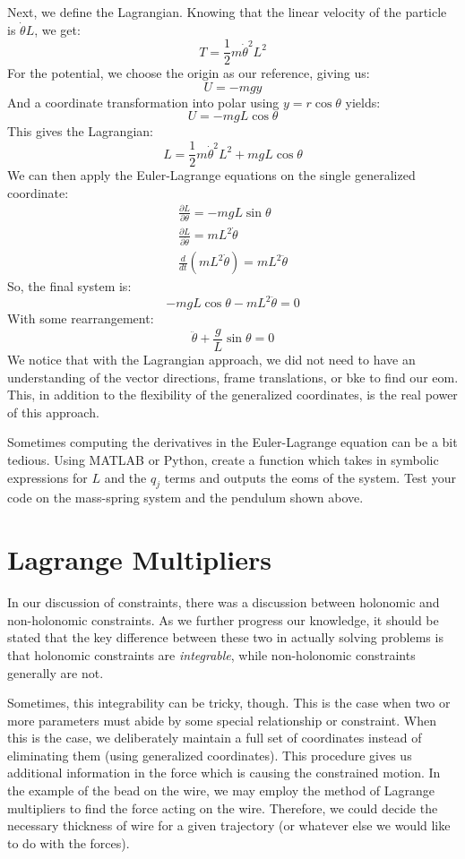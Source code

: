 Next, we define the \gls{Lagrangian}. Knowing that the linear velocity of the particle is $\dot{\theta}L$, we get:
$$T=\frac{1}{2}m\dot{\theta}^2L^2$$
For the potential, we choose the origin as our reference, giving us:
$$U=-mgy$$
And a coordinate transformation into polar using $y=r\cos\theta$ yields:
$$U=-mgL\cos\theta$$
This gives the \gls{Lagrangian}:
$$L=\frac{1}{2}m\dot{\theta}^2L^2+mgL\cos\theta$$
We can then apply the Euler-Lagrange equations on the single generalized coordinate:
\begin{gather}
    \frac{\partial L}{\partial \theta}=-mgL\sin\theta\\
    \frac{\partial L}{\partial \dot{\theta}}=mL^2\dot{\theta}\\
    \frac{d}{dt}\left(mL^2\dot{\theta}\right)=mL^2\ddot{\theta}
\end{gather}
So, the final system is:
$$-mgL\cos\theta -mL^2\ddot{\theta}=0$$
With some rearrangement:
$$\ddot{\theta}+\frac{g}{L}\sin\theta=0$$
We notice that with the \gls{Lagrangian} approach, we did not need to have an understanding of the vector directions, frame translations, or \gls{bke} to find our \gls{eom}. This, in addition to the flexibility of the generalized coordinates, is the real power of this approach.

\begin{exercise}\label{ex:lagrangiancode}
Sometimes computing the derivatives in the Euler-Lagrange equation can be a bit tedious. Using MATLAB or Python, create a function which takes in symbolic expressions for $L$ and the $q_j$ terms and outputs the \glspl{eom} of the system. Test your code on the mass-spring system and the pendulum shown above.
\end{exercise}


\section{Lagrange Multipliers}
In our discussion of constraints, there was a discussion between holonomic and non-holonomic constraints. As we further progress our knowledge, it should be stated that the key difference between these two in actually solving problems is that holonomic constraints are \textit{integrable}, while non-holonomic constraints generally are not.

Sometimes, this integrability can be tricky, though. This is the case when two or more parameters must abide by some special relationship or constraint. When this is the case, we deliberately maintain a full set of coordinates instead of eliminating them (using generalized coordinates). This procedure gives us additional information in the force which is causing the constrained motion. In the example of the bead on the wire, we may employ the method of Lagrange multipliers to find the force acting on the wire. Therefore, we could decide the necessary thickness of wire for a given trajectory (or whatever else we would like to do with the forces).

